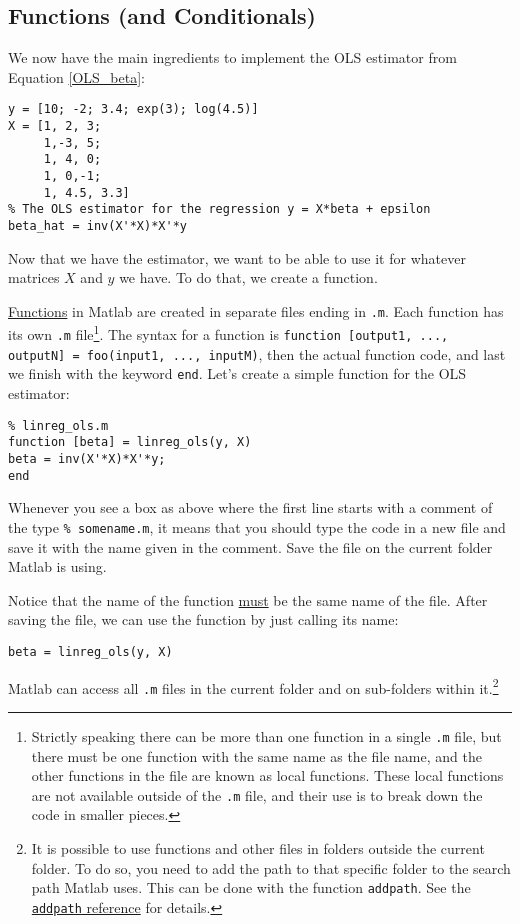 \documentclass[12pt, a4paper]{article}
\begin{document}
\subsection{Functions (and Conditionals)}
\label{sec:orgbd4f478}
We now have the main ingredients to implement the OLS estimator from Equation \ref{OLS_beta}:
\lstset{language=matlab,label= ,caption= ,captionpos=b,firstnumber=1,numbers=left,style=Matlab-editor}
\begin{lstlisting}
y = [10; -2; 3.4; exp(3); log(4.5)]
X = [1, 2, 3;
     1,-3, 5;
     1, 4, 0;
     1, 0,-1;
     1, 4.5, 3.3]
% The OLS estimator for the regression y = X*beta + epsilon
beta_hat = inv(X'*X)*X'*y
\end{lstlisting}
Now that we have the estimator, we want to be able to use it for whatever matrices \(X\) and \(y\) we have.
To do that, we create a function.

\href{https://www.mathworks.com/help/matlab/ref/function.html}{Functions} in Matlab are created in separate files ending in \texttt{.m}.
Each function has its own \texttt{.m} file\footnote{Strictly speaking there can be more than one function in a single \texttt{.m} file, but there must be one function with the same name as the file name, and the other functions in the file are known as local functions. These local functions are not available outside of the \texttt{.m} file, and their use is to break down the code in smaller pieces.}.
The syntax for a function is \texttt{function [output1, ..., outputN] = foo(input1, ..., inputM)}, then the actual function code, and last we finish with the keyword \texttt{end}.
Let's create a simple function for the OLS estimator:
\lstset{language=matlab,label= ,caption= ,captionpos=b,firstnumber=1,numbers=left,style=Matlab-editor}
\begin{lstlisting}
% linreg_ols.m
function [beta] = linreg_ols(y, X)
beta = inv(X'*X)*X'*y;
end
\end{lstlisting}
Whenever you see a box as above where the first line starts with a comment of the type \texttt{\% somename.m}, it means that you should type the code in a new file and save it with the name given in the comment.
Save the file on the current folder Matlab is using.

Notice that the name of the function \uline{must} be the same name of the file.
After saving the file, we can use the function by just calling its name:
\lstset{language=matlab,label= ,caption= ,captionpos=b,firstnumber=1,numbers=left,style=Matlab-editor}
\begin{lstlisting}
beta = linreg_ols(y, X)
\end{lstlisting}
Matlab can access all \texttt{.m} files in the current folder and on sub-folders within it.\footnote{It is possible to use functions and other files in folders outside the current folder. To do so, you need to add the path to that specific folder to the search path Matlab uses. This can be done with the function \texttt{addpath}. See the \href{https://www.mathworks.com/help/matlab/ref/addpath.html}{\texttt{addpath} reference} for details.}
\end{document}
